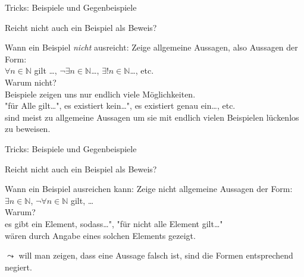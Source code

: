 \documentclass[10pt]{beamer}
\begin{document}
\begin{frame}[fragile]{Tricks: Beispiele und Gegenbeispiele}
    \begin{alertblock}{Reicht nicht auch ein Beispiel als Beweis?}
    \end{alertblock}
    \begin{block}{Wann ein Beispiel \emph{nicht} ausreicht:}
        Zeige allgemeine Aussagen, also Aussagen der Form:\\$\forall n\in\mathbb{N}$ gilt \dots, $\neg\exists n\in\mathbb{N}$\dots, $\exists!n\in\mathbb{N}$\dots, etc.\\
        \alert{Warum nicht?}\\
        Beispiele zeigen uns nur endlich viele Möglichkeiten.\\
        "für Alle gilt\dots", \dq es existiert kein\dots", es existiert genau ein\dots, etc. \\sind meist zu allgemeine Aussagen um sie mit endlich vielen Beispielen lückenlos zu beweisen.
    \end{block}
\end{frame}

\begin{frame}[fragile]{Tricks: Beispiele und Gegenbeispiele}
    \begin{alertblock}{Reicht nicht auch ein Beispiel als Beweis?}
    \end{alertblock}
    \begin{block}{Wann ein Beispiel ausreichen kann:}
        Zeige nicht allgemeine Aussagen der Form:\\
        $\exists n\in\mathbb{N}$, $\neg\forall n\in\mathbb{N}$ gilt, \dots\\
        \alert{Warum?}\\
        \dq es gibt ein Element, sodass\dots", "für nicht alle Element gilt\dots"\\wären durch Angabe eines solchen Elements gezeigt.
    \end{block}
        $\leadsto$ will man zeigen, dass eine Aussage falsch ist, sind die Formen entsprechend negiert.
\end{frame}
\end{document}
